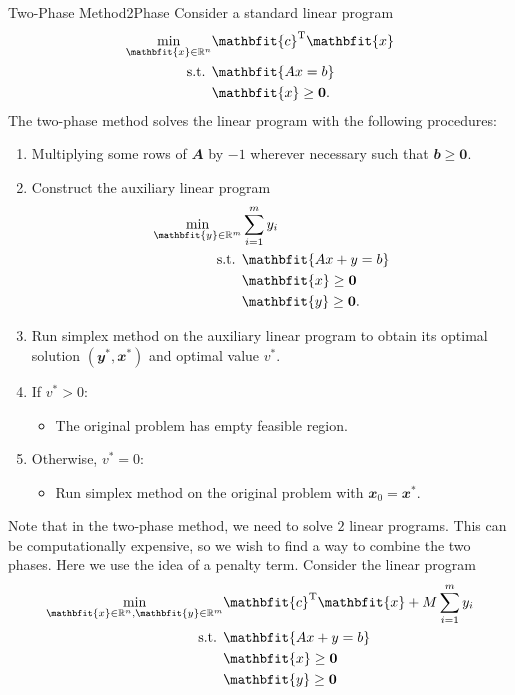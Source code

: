 \documentclass[math, code]{amznotes}
\theoremstyle{remark}
\begin{document}
\begin{tecbox}{Two-Phase Method}{2Phase}
    Consider a standard linear program
    \begin{align*}
        \min_{\mathbfit{x} \in \R^n} & \mathbfit{c}^{\mathrm{T}}\mathbfit{x} \\
        \textrm{s.t. } & \mathbfit{Ax = b} \\
        & \mathbfit{x} \geq \mathbf{0}.
    \end{align*}
    The two-phase method solves the linear program with the following procedures:
    \begin{enumerate}
        \item Multiplying some rows of $\mathbfit{A}$ by $-1$ wherever necessary such that $\mathbfit{b} \geq \mathbf{0}$.
        \item Construct the auxiliary linear program
        \begin{align*}
            \min_{\mathbfit{y} \in \R^m} & \sum_{i = 1}^{m}y_i \\
            \textrm{s.t. } & \mathbfit{Ax + y = b} \\
            & \mathbfit{x} \geq \mathbf{0} \\
            & \mathbfit{y} \geq \mathbf{0}.
        \end{align*}
        \item Run simplex method on the auxiliary linear program to obtain its optimal solution $\left(\mathbfit{y}^*, \mathbfit{x}^*\right)$ and optimal value $v^*$.
        \item If $v^* > 0$:
        \begin{itemize}
            \item The original problem has empty feasible region.
        \end{itemize}
        \item Otherwise, $v^* = 0$:
        \begin{itemize}
            \item Run simplex method on the original problem with $\mathbfit{x}_0 = \mathbfit{x}^*$.
        \end{itemize}
    \end{enumerate} 
\end{tecbox}  
Note that in the two-phase method, we need to solve $2$ linear programs. This can be computationally expensive, so we wish to find a way to combine the two phases. Here we use the idea of a penalty term. Consider the linear program
\begin{align*}
    \min_{\mathbfit{x} \in \R^n, \mathbfit{y} \in \R^m} & \mathbfit{c}^{\mathrm{T}}\mathbfit{x} + M\sum_{i = 1}^{m}y_i \\
    \textrm{s.t. } & \mathbfit{Ax + y = b} \\
    & \mathbfit{x} \geq \mathbf{0} \\
    & \mathbfit{y} \geq \mathbf{0}
\end{align*}
\end{document}
